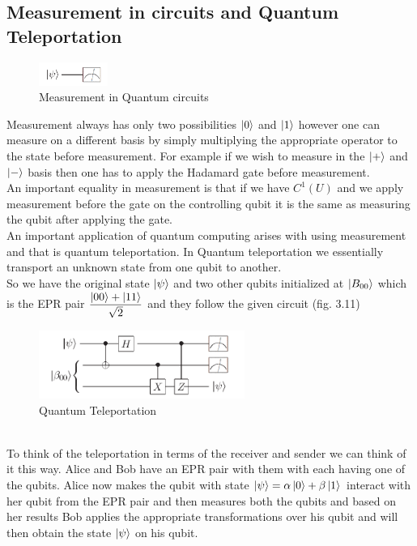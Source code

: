 \documentclass{report}
\begin{document}
\subsection{Measurement in circuits and Quantum Teleportation}
\begin{figure}[ht]
\centering
\includegraphics[width = 0.2\textwidth]{images/measurement.png}
\caption{Measurement in Quantum circuits}
\end{figure}
Measurement always has only two possibilities $\ket{0}$ and $\ket{1}$ however one can measure on a different basis by simply multiplying the appropriate operator to the state before measurement. For example if we wish to measure in the $\ket{+}$ and $\ket{-}$ basis then one has to apply the Hadamard gate before measurement.\\
An important equality in measurement is that if we have $C^1(U)$ and we apply measurement before the gate on the controlling qubit it is the same as measuring the qubit after applying the gate.\\
An important application of quantum computing arises with using measurement and that is quantum teleportation. In Quantum teleportation we essentially transport an unknown state from one qubit to another.\\
So we have the original state $\ket{\psi}$ and two other qubits initialized at $\ket{B_{00}}$ which is the EPR pair $\dfrac{\ket{00} + \ket{11}}{\sqrt{2}}$ and they follow the given circuit (fig. 3.11)\\
\begin{figure}[ht]
\centering
\includegraphics[width = 0.6\textwidth]{images/teleportation.png}
\caption{Quantum Teleportation}
\end{figure}\\
To think of the teleportation in terms of the receiver and sender we can think of it this way. Alice and Bob have an EPR pair with them with each having one of the qubits. Alice now makes the qubit with state $\ket{\psi} = \alpha\ket{0} + \beta\ket{1}$ interact with her qubit from the EPR pair and then measures both the qubits and based on her results Bob applies the appropriate transformations over his qubit and will then obtain the state $\ket{\psi}$ on his qubit.\\
\end{document}
